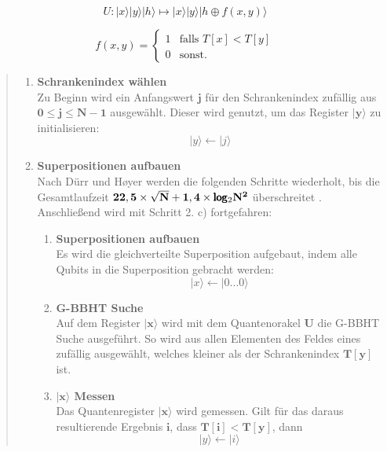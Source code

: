 \begin{equation}
    U: |x\rangle|y\rangle|h\rangle \mapsto |x\rangle|y\rangle|h \oplus f(x,y)\rangle
\end{equation}

\begin{equation}
    f(x,y) = \begin{cases}
        1 & \text{falls } T[x] < T[y]\\    
        0 & \text{sonst.}   
      \end{cases}
\end{equation}

\begin{quote}
    \begin{enumerate}
        \item \textbf{Schrankenindex wählen}
        \\
        Zu Beginn wird ein Anfangswert $\mathbf{j}$ für den Schrankenindex zufällig aus $\mathbf{0 \leq j \leq N-1}$ ausgewählt. Dieser wird genutzt, um das Register $\mathbf{|y\rangle}$ zu initialisieren: 
        \begin{equation}
            |y\rangle \leftarrow |j\rangle
        \end{equation}
        \item \textbf{Superpositionen aufbauen}
        \\
        Nach Dürr und Høyer werden die folgenden Schritte wiederholt, bis die Gesamtlaufzeit $\mathbf{22,5 \times \sqrt{N} + 1,4 \times \pmb\log\textsubscript{2}N^2}$ überschreitet \cite[S. 141]{Ho96}. 
        Anschließend wird mit Schritt 2. c) fortgefahren:
        \\
        \begin{enumerate}
            \item \textbf{Superpositionen aufbauen}
            \\
            Es wird die gleichverteilte Superposition aufgebaut, indem alle Qubits in die Superposition gebracht werden:
            \begin{equation}
                |x\rangle \leftarrow |0 ... 0 \rangle
            \end{equation}
            \item \textbf{G-BBHT Suche}
            \\
            Auf dem Register $\mathbf{|x\rangle}$ wird mit dem Quantenorakel $\mathbf{U}$ die G-BBHT Suche ausgeführt. 
            So wird aus allen Elementen des Feldes eines zufällig ausgewählt, welches kleiner als der Schrankenindex $\mathbf{T[y]}$ ist.
            \item \textbf{$\mathbf{|x\rangle}$ Messen}
            \\
            Das Quantenregister $\mathbf{|x\rangle}$ wird gemessen. 
            Gilt für das daraus resultierende Ergebnis $\mathbf{i}$, dass $\mathbf{T[i] < T[y]}$, dann 
            \begin{equation}
                |y\rangle \leftarrow |i\rangle
            \end{equation}
        \end{enumerate}


\end{enumerate}
\end{quote}
